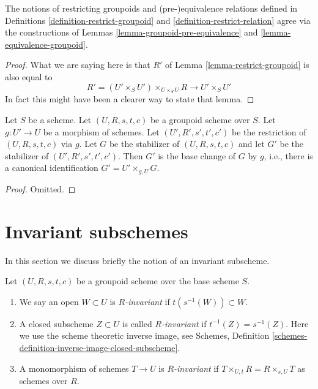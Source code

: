\begin{lemma}
\label{lemma-restrict-groupoid-relation}
The notions of restricting groupoids and
(pre-)equivalence relations defined in Definitions
\ref{definition-restrict-groupoid} and \ref{definition-restrict-relation}
agree via the constructions of
Lemmas \ref{lemma-groupoid-pre-equivalence} and
\ref{lemma-equivalence-groupoid}.
\end{lemma}

\begin{proof}
What we are saying here is that $R'$ of
Lemma \ref{lemma-restrict-groupoid} is also
equal to
$$
R' = (U' \times_S U')\times_{U \times_S U} R
\longrightarrow
U' \times_S U'
$$
In fact this might have been a clearer way to state that lemma.
\end{proof}

\begin{lemma}
\label{lemma-restrict-stabilizer}
Let $S$ be a scheme.
Let $(U, R, s, t, c)$ be a groupoid scheme over $S$.
Let $g : U' \to U$ be a morphism of schemes.
Let $(U', R', s', t', c')$ be the restriction of $(U, R, s, t, c)$ via $g$.
Let $G$ be the stabilizer of $(U, R, s, t, c)$ and let
$G'$ be the stabilizer of $(U', R', s', t', c')$.
Then $G'$ is the base change of $G$ by $g$, i.e.,
there is a canonical identification $G' = U' \times_{g, U} G$.
\end{lemma}

\begin{proof}
Omitted.
\end{proof}






\section{Invariant subschemes}
\label{section-invariant}

\noindent
In this section we discuss briefly the notion of an invariant subscheme.

\begin{definition}
\label{definition-invariant-open}
Let $(U, R, s, t, c)$ be a groupoid scheme over the base scheme $S$.
\begin{enumerate}
\item We say an open $W \subset U$ is {\it $R$-invariant} if
$t(s^{-1}(W)) \subset W$.
\item A closed subscheme $Z \subset U$ is called {\it $R$-invariant}
if $t^{-1}(Z) = s^{-1}(Z)$. Here we use the scheme theoretic inverse image, see
Schemes, Definition \ref{schemes-definition-inverse-image-closed-subscheme}.
\item A monomorphism of schemes $T \to U$ is {\it $R$-invariant} if
$T \times_{U, t} R = R \times_{s, U} T$ as schemes over $R$.
\end{enumerate}
\end{definition}

